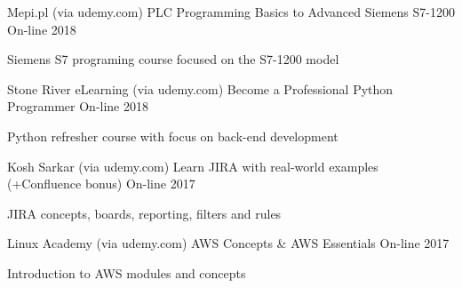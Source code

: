 

\begin{cventries}

  \cventry
    {Mepi.pl (via udemy.com)} %
    {PLC Programming Basics to Advanced Siemens S7-1200} %
    {On-line} %
    {2018} %
    {
      \begin{cvitems} %
        \item {Siemens S7 programing course focused on the S7-1200 model}
      \end{cvitems}
    }

  \cventry
    {Stone River eLearning (via udemy.com)} %
    {Become a Professional Python Programmer} %
    {On-line} %
    {2018} %
    {
      \begin{cvitems} %
        \item {Python refresher course with focus on back-end development}
      \end{cvitems}
    }

  \cventry
    {Kosh Sarkar (via udemy.com)} %
    {Learn JIRA with real-world examples (+Confluence bonus)} %
    {On-line} %
    {2017} %
    {
      \begin{cvitems} %
        \item {JIRA concepts, boards, reporting, filters and rules}
      \end{cvitems}
    }

  \cventry
    {Linux Academy (via udemy.com)} %
    {AWS Concepts \& AWS Essentials} %
    {On-line} %
    {2017} %
    {
      \begin{cvitems} %
        \item {Introduction to AWS modules and concepts}
      \end{cvitems}
    }


\end{cventries}
